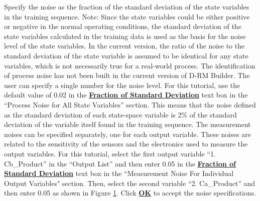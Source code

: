 \begin{enumerate}
\begin{figure}[H]
\begin{center}
			\label{fig.drm_specify_noise_dlg}
		\end{center}
	\end{figure} 
	Specify the noise as the fraction of the standard deviation of the state variables in the training sequence.  Note: Since the state variables could be either positive or negative in the normal operating conditions, the standard deviation of the state variables calculated in the training data is used as the basis for the noise level of the state variables.  In the current version, the ratio of the noise to the standard deviation of the state variable is assumed to be identical for any state variables, which is not necessarily true for a real-world process.  The identification of process noise has not been built in the current version of D-RM Builder.  The user can specify a single number for the noise level.  For this tutorial, use the default value of 0.02 in the \textbf{\underline{Fraction of Standard Deviation}} text box in the ``Process Noise for All State Variables'' section.  This means that the noise defined as the standard deviation of each state-space variable is 2\% of the standard deviation of the variable itself found in the training sequence.  The measurement noises can be specified separately, one for each output variable.  These noises are related to the sensitivity of the sensors and the electronics used to measure the output variables.  For this tutorial, select the first output variable ``1. Cb\_Product'' in the ``Output List'' and then enter 0.05 in the \textbf{\underline{Fraction of Standard Deviation}} text box in the ``Measurement Noise For Individual Output Variables" section.  Then, select the second variable ``2. Ca\_Product'' and then enter 0.05 as shown in Figure \ref{fig.drm_specify_noise_dlg}.  Click \textbf{\underline{OK}} to accept the noise specifications.

\end{enumerate}
